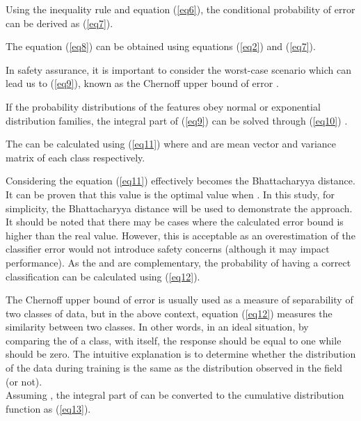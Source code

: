 \documentclass{article}
\begin{document}
 

Using the inequality rule and equation (\ref{eq6}), the conditional probability of error can be derived as (\ref{eq7}).



The equation (\ref{eq8}) can be obtained using equations (\ref{eq2}) and (\ref{eq7}).



In safety assurance, it is important to consider the worst-case scenario which can lead us to (\ref{eq9}), known as the Chernoff upper bound of error \cite{fukunaga2013introduction}.

 

If the probability distributions of the features obey normal or exponential distribution families, the integral part of (\ref{eq9}) can be solved through (\ref{eq10}) \cite{fukunaga2013introduction}.

 

The  can be calculated using (\ref{eq11}) where  and  are mean vector and variance matrix of each class respectively. 

 

Considering  the equation (\ref{eq11}) effectively becomes the Bhattacharyya distance. It can be proven that this value is the optimal value when  \cite{fukunaga2013introduction,nielsen2018chord}. In this study, for simplicity, the Bhattacharyya distance will be used to demonstrate the approach. It should be noted that there may be cases where the calculated error bound is higher than the real value. However, this is acceptable as an overestimation of the classifier error would not introduce safety concerns (although it may impact performance). As the  and  are complementary, the probability of having a correct classification can be calculated using (\ref{eq12}).

 

The Chernoff  upper bound of error is usually used as a measure of separability of two classes of data, but in the above context, equation (\ref{eq12}) measures the similarity between two classes. In other words, in an ideal situation, by comparing the  of a class, with itself, the response should be equal to one while  should be zero. The intuitive explanation is to determine whether the distribution of the data during training is the same as the distribution observed in the field (or not). \\
Assuming , the integral part of  can be converted to the cumulative distribution function as (\ref{eq13}).
 
\end{document}
